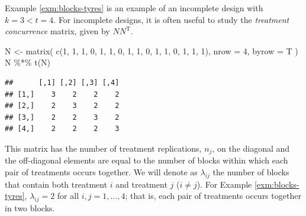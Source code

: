 \documentclass[
]{book}
\newenvironment{Shaded}{\begin{snugshade}}{\end{snugshade}}
\newcommand{\AttributeTok}[1]{\textcolor[rgb]{0.77,0.63,0.00}{#1}}
\newcommand{\DecValTok}[1]{\textcolor[rgb]{0.00,0.00,0.81}{#1}}
\newcommand{\FunctionTok}[1]{\textcolor[rgb]{0.00,0.00,0.00}{#1}}
\newcommand{\NormalTok}[1]{#1}
\newcommand{\OtherTok}[1]{\textcolor[rgb]{0.56,0.35,0.01}{#1}}
\newcommand{\SpecialCharTok}[1]{\textcolor[rgb]{0.00,0.00,0.00}{#1}}
\theoremstyle{definition}
\theoremstyle{definition}
\theoremstyle{definition}
\theoremstyle{definition}
\theoremstyle{remark}
\begin{document}
Example \ref{exm:blocks-tyres} is an example of an incomplete design with \(k=3<t=4\). For incomplete designs, it is often useful to study the \emph{treatment concurrence} matrix, given by \(NN^{\mathrm{T}}\).

\begin{Shaded}
\begin{Highlighting}[]
\NormalTok{N }\OtherTok{\textless{}{-}} \FunctionTok{matrix}\NormalTok{(}
  \FunctionTok{c}\NormalTok{(}\DecValTok{1}\NormalTok{, }\DecValTok{1}\NormalTok{, }\DecValTok{1}\NormalTok{, }\DecValTok{0}\NormalTok{,}
    \DecValTok{1}\NormalTok{, }\DecValTok{1}\NormalTok{, }\DecValTok{0}\NormalTok{, }\DecValTok{1}\NormalTok{,}
    \DecValTok{1}\NormalTok{, }\DecValTok{0}\NormalTok{, }\DecValTok{1}\NormalTok{, }\DecValTok{1}\NormalTok{,}
    \DecValTok{0}\NormalTok{, }\DecValTok{1}\NormalTok{, }\DecValTok{1}\NormalTok{, }\DecValTok{1}\NormalTok{),}
  \AttributeTok{nrow =} \DecValTok{4}\NormalTok{, }\AttributeTok{byrow =}\NormalTok{ T}
\NormalTok{)}
\NormalTok{N }\SpecialCharTok{\%*\%} \FunctionTok{t}\NormalTok{(N)}
\end{Highlighting}
\end{Shaded}

\begin{verbatim}
##      [,1] [,2] [,3] [,4]
## [1,]    3    2    2    2
## [2,]    2    3    2    2
## [3,]    2    2    3    2
## [4,]    2    2    2    3
\end{verbatim}

This matrix has the number of treatment replications, \(n_j\), on the diagonal and the off-diagonal elements are equal to the number of blocks within which each pair of treatments occurs together. We will denote as \(\lambda_{ij}\) the number of blocks that contain both treatment \(i\) and treatment \(j\) (\(i\ne j\)). For Example \ref{exm:blocks-tyres}, \(\lambda_{ij} = 2\) for all \(i,j = 1,\ldots, 4\); that is, each pair of treatments occurs together in two blocks.
\end{document}
